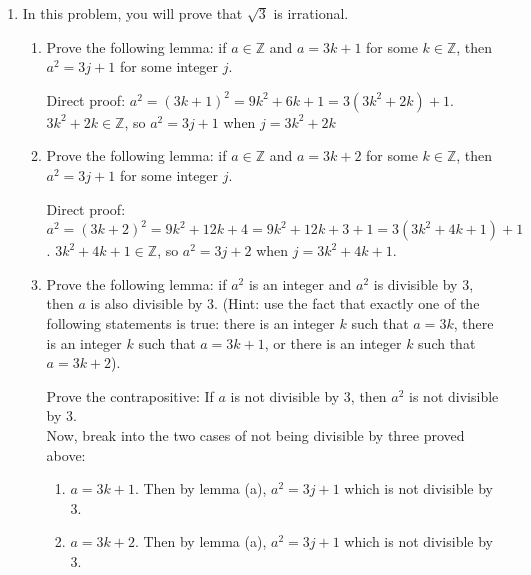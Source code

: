 \documentclass{article}
\begin{document}
\begin{enumerate}
    \item In this problem, you will prove that $\sqrt{3}$ is irrational.
    \begin{enumerate}
        \item Prove the following lemma: if $a \in \mathbb{Z}$ and $a = 3k + 1$ for some $k \in \mathbb{Z}$, then $a^2 = 3j + 1$ for some integer $j$.
        \begin{mdframed}
        Direct proof: $a^2 = (3k+1)^2 = 9k^2 + 6k + 1 = 3(3k^2 + 2k) + 1$. $3k^2 + 2k \in \mathbb{Z}$, so $a^2 = 3j + 1$ when $j = 3k^2 + 2k$
        \end{mdframed}
        \item Prove the following lemma: if $a \in \mathbb{Z}$ and $a = 3k + 2$ for some $k \in \mathbb{Z}$, then $a^2 = 3j + 1$ for some integer $j$.
        \begin{mdframed}
        Direct proof: $a^2 = (3k+2)^2 = 9k^2 + 12k + 4 = 9k^2 + 12k + 3 + 1 = 3(3k^2 + 4k + 1) + 1$. $3k^2 + 4k + 1\in \mathbb{Z}$, so $a^2 = 3j + 2$ when $j = 3k^2 + 4k + 1$.
        \end{mdframed}
        \item Prove the following lemma: if $a^2$ is an integer and $a^2$ is divisible by 3, then $a$ is also divisible by 3. (Hint: use the fact that exactly one of the following statements is true: there is an integer $k$ such that $a = 3k$, there is an integer $k$ such that $a = 3k + 1$, or there is an integer $k$ such that $a = 3k + 2$).
        \begin{mdframed}
        Prove the contrapositive: If $a$ is not divisible by 3, then $a^2$ is not divisible by 3. \\
        Now, break into the two cases of not being divisible by three proved above:
        \begin{enumerate}
            \item $a = 3k + 1$. Then by lemma (a), $a^2 = 3j + 1$ which is not divisible by 3.
            \item $a = 3k + 2$. Then by lemma (a), $a^2 = 3j + 1$ which is not divisible by 3.
        \end{enumerate}
        

\end{mdframed}
\end{enumerate}
\end{enumerate}
\end{document}
